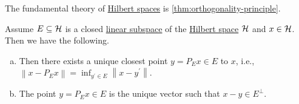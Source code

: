 The fundamental theory of \hyperref[def:Hilbert-space]{Hilbert spaces} is \autoref{thm:orthogonality-principle}.

\begin{theorem}\label{thm:orthogonality-principle}
	Assume \(E\subseteq \mathcal{\MakeUppercase{h}} \) is a closed \hyperref[def:linear-vector-space]{linear subspace} of the \hyperref[def:Hilbert-space]{Hilbert space} \(\mathcal{\MakeUppercase{h}} \) and \(x\in \mathcal{\MakeUppercase{h}} \). Then we have the following.
	\begin{enumerate}[(a)]
		\item Then there exists a unique closest point \(y = P_E x\in E\) to \(x\), i.e., \(\left\lVert x - P_E x\right\rVert = \inf _{y^\prime \in E} \left\lVert x - y^\prime \right\rVert \).
		\item The point \(y = P_E x\in E\) is the unique vector such that \(x - y\in E^{\perp}\).
	\end{enumerate}
	\begin{center}
	\end{center}
\end{theorem}
